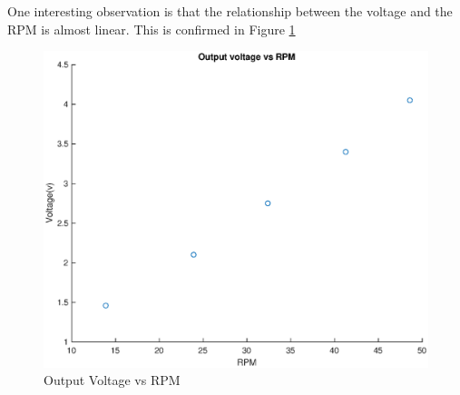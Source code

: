 \documentclass[a4paper]{article}
\begin{document}



One interesting observation is that the relationship between the voltage and the 
RPM is almost linear. This is confirmed in Figure \ref{graph: Output Voltage vs RPM}



 \begin{figure}[H]
    \centering
    \begin{minipage}{.3\textwidth}
      \centering
      \includegraphics[scale=0.22]{./media/voltagevsrpm.eps}
   \caption{Output Voltage vs RPM}
   \label{graph: Output Voltage vs RPM}
    \end{minipage}%
\end{figure}




\end{document}
